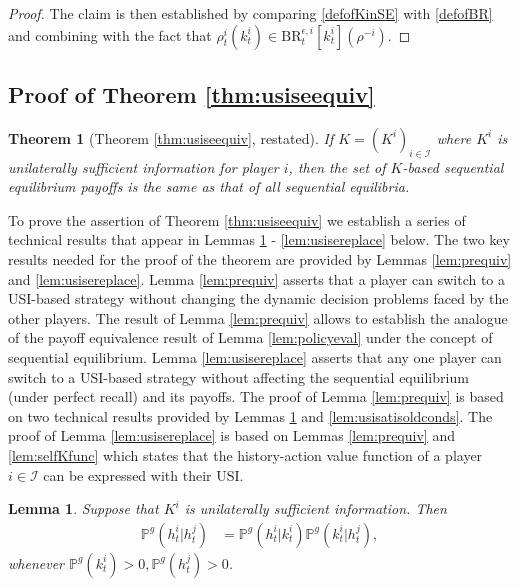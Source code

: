 \documentclass[pdflatex,sn-basic]{sn-jnl}
\renewcommand{\Pr}{\mathbb{P}}
\newcommand{\Comp}{K}
\newcommand{\comp}{k}
\theoremstyle{thmstyleone}%
\newtheorem{thm}{Theorem}
\newtheorem{lemma}{Lemma}
\theoremstyle{thmstyletwo}%
\theoremstyle{thmstylethree}%
\begin{document}
\begin{appendices}
\begin{proof}
	The claim is then established by comparing \eqref{defofKinSE} with \eqref{defofBR} and combining with the fact that $\rho_t^i(\comp_t^i)\in \mathrm{BR}_t^{\epsilon, i}[\comp_t^i] (\rho^{-i})$.
\end{proof}

\subsection{Proof of Theorem \ref{thm:usiseequiv}}\label{app:thm:usiseequiv}

\begin{thm}[Theorem \ref{thm:usiseequiv}, restated]
	If $\Comp=(\Comp^i)_{i\in\mathcal{I}}$ where $\Comp^i$ is unilaterally sufficient information for player $i$, then the set of $\Comp$-based sequential equilibrium payoffs is the same as that of all sequential equilibria.
\end{thm}

{To prove the assertion of Theorem \ref{thm:usiseequiv} we establish a series of technical results that appear in Lemmas \ref{lem:htihtjcondindepqti} - \ref{lem:usisereplace} below. The two key results needed for the proof of the theorem are provided by Lemmas \ref{lem:prequiv} and \ref{lem:usisereplace}. Lemma \ref{lem:prequiv} asserts that a player can switch to a USI-based strategy without changing the dynamic decision problems faced by the other players. The result of Lemma \ref{lem:prequiv} allows to establish the analogue of the payoff equivalence result of Lemma \ref{lem:policyeval} under the concept of sequential equilibrium. Lemma \ref{lem:usisereplace} asserts that any one player can switch to a USI-based strategy without affecting the sequential equilibrium (under perfect recall) and its payoffs. The proof of Lemma \ref{lem:prequiv} is based on two technical results provided by Lemmas \ref{lem:htihtjcondindepqti} and \ref{lem:usisatisoldconds}. The proof of Lemma \ref{lem:usisereplace} is based on Lemmas \ref{lem:prequiv} and \ref{lem:selfKfunc} which states that the history-action value function of a player $i\in\mathcal{I}$ can be expressed with their USI.}

\begin{lemma}\label{lem:htihtjcondindepqti}
	Suppose that $\Comp^i$ is unilaterally sufficient information. Then
	\begin{align}
		\Pr^g(h_t^i|h_t^j) &= \Pr^{g}(h_t^i|\comp_t^i)\Pr^g(\comp_t^i|h_t^j),\label{delaware}
	\end{align}
	whenever $\Pr^g(\comp_t^i) > 0, \Pr^g(h_t^j) > 0$.
\end{lemma}


\end{appendices}
\end{document}
